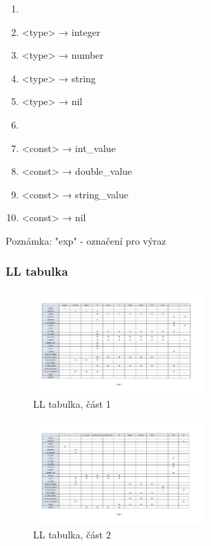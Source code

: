 \documentclass[a4paper, 12pt]{article}
\begin{document}
\begin{enumerate}
    \item[]
    \item <type> → integer
    \item <type> → number
    \item <type> → string
    \item <type> → nil
    \item[]
    \item <const> → int\_value
    \item <const> → double\_value
    \item <const> → string\_value
    \item <const> → nil
\end{enumerate}

\vspace{1cm}
Poznámka: "exp" - označení pro výraz

\newpage

\subsubsection{LL tabulka}
\begin{figure}[ht!]
\begin{center}
  \includegraphics[angle=90,origin=c, width=0.59\textwidth, trim={0 2.5cm 0 2.5cm},clip]{images/LL_table_1.pdf}
  \caption{LL tabulka, část 1}
\end{center}
\end{figure}


\newpage

\begin{figure}[ht!]
\begin{center}
  \includegraphics[angle=90,origin=c, width=0.59\textwidth, trim={0 2.5cm 0 2.5cm},clip]{images/LL_table_2.pdf}
  \caption{LL tabulka, část 2}
\end{center}
\end{figure}
\end{document}
